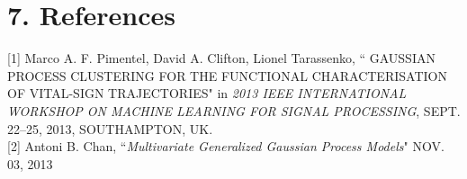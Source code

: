 \documentclass[letterpaper]{article}
\begin{document}
\section{7.  References}

[1] Marco A. F. Pimentel, David A. Clifton, Lionel Tarassenko, `` GAUSSIAN PROCESS CLUSTERING FOR THE FUNCTIONAL CHARACTERISATION OF VITAL-SIGN TRAJECTORIES"
 in {\it 2013 IEEE INTERNATIONAL WORKSHOP ON MACHINE LEARNING FOR SIGNAL PROCESSING}, SEPT. 22–25, 2013, SOUTHAMPTON, UK. \\

[2] Antoni B. Chan, ``{\it Multivariate Generalized Gaussian Process Models}" NOV. 03, 2013
\end{document}
